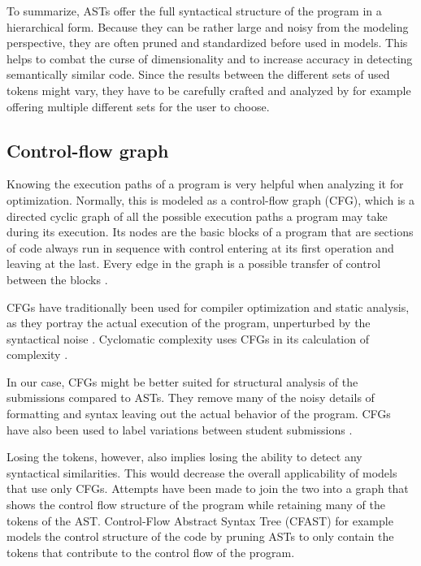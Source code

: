 To summarize, ASTs offer the full syntactical structure of the program in a hierarchical form. Because they can be rather large and noisy from the modeling perspective, they are often pruned and standardized before used in models. This helps to combat the curse of dimensionality and to increase accuracy in detecting semantically similar code. Since the results between the different sets of used tokens might vary, they have to be carefully crafted and analyzed by for example offering multiple different sets for the user to choose. 

\subsection{Control-flow graph}

Knowing the execution paths of a program is very helpful when analyzing it for optimization. Normally, this is modeled as a control-flow graph (CFG), which is a directed cyclic graph of all the possible execution paths a program may take during its execution. Its nodes are the basic blocks of a program that are sections of code always run in sequence with control entering at its first operation and leaving at the last. Every edge in the graph is a possible transfer of control between the blocks \cite{control-flow-analysis, aho2007compilers, engineering-compiler}.

CFGs have traditionally been used for compiler optimization and static analysis, as they portray the actual execution of the program, unperturbed by the syntactical noise \cite{control-flow-analysis, engineering-compiler}. Cyclomatic complexity uses CFGs in its calculation of complexity \cite{mccabe-1976}.

In our case, CFGs might be better suited for structural analysis of the submissions compared to ASTs. They remove many of the noisy details of formatting and syntax leaving out the actual behavior of the program. CFGs have also been used to label variations between student submissions \cite{glass-feature-engineering, luxton-sub-variation-2013}.

Losing the tokens, however, also implies losing the ability to detect any syntactical similarities. This would decrease the overall applicability of models that use only CFGs. Attempts have been made to join the two into a graph that shows the control flow structure of the program while retaining many of the tokens of the AST. Control-Flow Abstract Syntax Tree (CFAST) \cite{cfast} for example models the control structure of the code by pruning ASTs to only contain the tokens that contribute to the control flow of the program.

